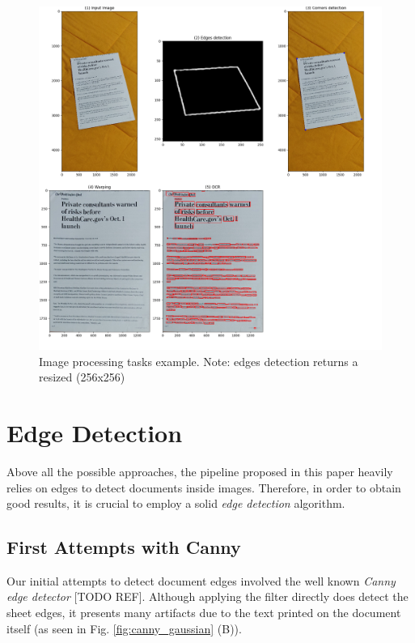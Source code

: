 \documentclass[a4paper]{article}
\begin{document}
\begin{figure}[H]
	\includegraphics[width=\linewidth]{ipt.png}
	\caption{Image processing tasks example. Note: edges detection returns a resized (256x256)}
	\label{fig:imageprocessing}
\end{figure}

\section{Edge Detection}

Above all the possible approaches, the pipeline proposed in this paper heavily
relies on edges to detect documents inside images. Therefore, in order to obtain
good results, it is crucial to employ a solid \textit{edge detection} algorithm.


\subsection{First Attempts with Canny}

Our initial attempts to detect document edges involved the well known \textit{Canny edge detector} [TODO REF]. Although applying the filter directly does detect the sheet edges, it presents many artifacts
due to the text printed on the document itself (as seen in Fig. \ref{fig:canny_gaussian} (B)).
\end{document}
